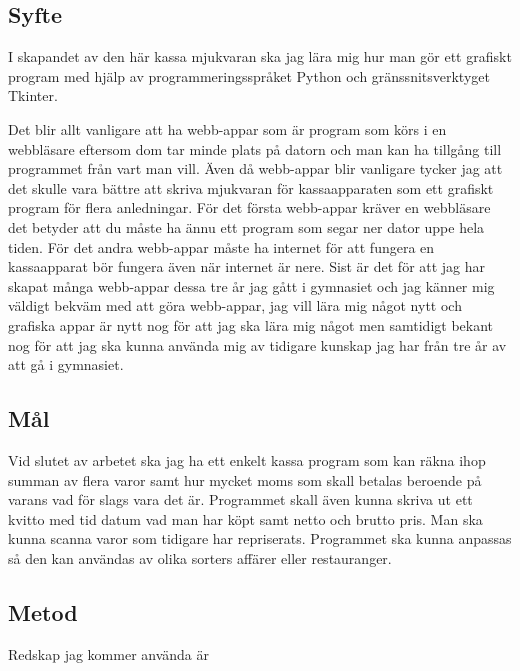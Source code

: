 \documentclass[a4paper, 12pt]{article}
\begin{document}
\subsection{Syfte}

I skapandet av den här kassa mjukvaran ska jag lära mig hur man gör ett grafiskt program med hjälp av programmeringsspråket Python och gränssnitsverktyget Tkinter.

Det blir allt vanligare att ha webb-appar som är program som körs i en webbläsare eftersom dom tar minde plats på datorn och man kan ha tillgång till programmet från vart man vill.
Även då webb-appar blir vanligare tycker jag att det skulle vara bättre att skriva mjukvaran för kassaapparaten som ett grafiskt program för flera anledningar.
För det första webb-appar kräver en webbläsare det betyder att du måste ha ännu ett program som segar ner dator uppe hela tiden.
För det andra webb-appar måste ha internet för att fungera en kassaapparat bör fungera även när internet är nere.
Sist är det för att jag har skapat många webb-appar dessa tre år jag gått i gymnasiet och jag känner mig väldigt bekväm med att göra webb-appar, jag vill lära mig något nytt och grafiska appar är nytt nog för att jag ska lära mig något men samtidigt bekant nog för att jag ska kunna använda mig av tidigare kunskap jag har från tre år av att gå i gymnasiet.

\subsection{Mål}

Vid slutet av arbetet ska jag ha ett enkelt kassa program som kan räkna ihop summan av flera varor samt hur mycket moms som skall betalas beroende på varans vad för slags vara det är.
 Programmet skall även kunna skriva ut ett kvitto med tid datum vad man har köpt samt netto och brutto pris.
 Man ska kunna scanna varor som tidigare har repriserats.
 Programmet ska kunna anpassas så den kan användas av olika sorters affärer eller restauranger.

\subsection{Metod}

Redskap jag kommer använda är
\end{document}
